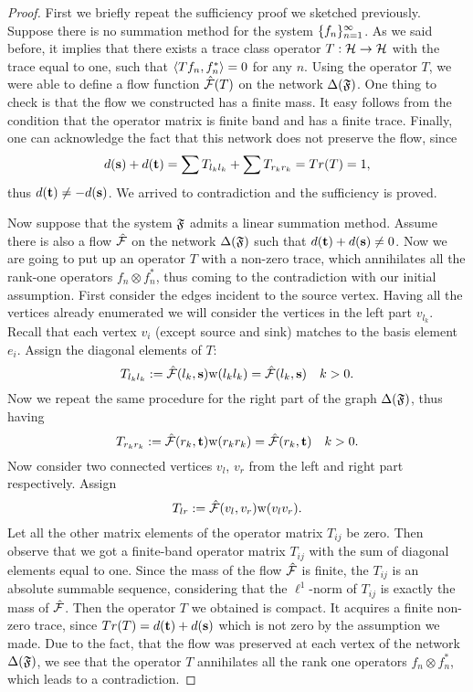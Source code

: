 \documentclass[12pt]{article}
\begin{document}
    \begin{proof}
      First we briefly repeat the sufficiency proof we sketched previously.
      Suppose there is no summation method for the system $\seq{f}$.
      As we said before, it implies that there exists a trace class operator $T : \cal{H} \to \cal{H}$ with
      the trace equal to one, such that $\inner{Tf_n}{f_n^*} = 0$ for any $n$.
      Using the operator $T$, we were able to define a flow function $\flow(T)$ on the network
      $\net(\fsys)$.
      One thing to check is that the flow we constructed has a finite mass.
      It easy follows from the condition that the operator matrix is finite band and has a finite trace.
      Finally, one can acknowledge the fact that this network does not preserve the flow, since
      \[
        d(\source) + d(\sink) = \sum T_{l_k l_k} + \sum T_{r_k r_k} = Tr(T) = 1,
      \]
      thus $d(\sink) \neq -d(\source)$.
      We arrived to contradiction and the sufficiency is proved.

      Now suppose that the system $\fsys$ admits a linear summation method.
      Assume there is also a flow $\flow$ on the network $\net(\fsys)$ such that $d(\sink) + d(\source) \neq 0$.
      Now we are going to put up an operator $T$ with a non-zero trace, which annihilates all the rank-one
      operators $f_n \otimes f^*_n$, thus coming to the contradiction with our initial assumption.
      First consider the edges incident to the source vertex.
      Having all the vertices already enumerated we will consider the vertices in the left part $v_{l_k}$.
      Recall that each vertex $v_i$ (except source and sink) matches to the basis element $e_i$.
      Assign the diagonal elements of $T$:
      \[
        T_{l_k l_k} := \flow(l_k, \source) \wtp(l_k l_k) = \flow(l_k, \source) \quad k > 0.
      \]
      Now we repeat the same procedure for the right part of the graph $\net(\fsys)$, thus having
      \[
        T_{r_k r_k} := \flow(r_k, \sink) \wtp(r_k r_k) = \flow(r_k, \sink) \quad k > 0.
      \]
      Now consider two connected vertices $v_l$, $v_r$ from the left and right part
        respectively. Assign
      \[
        T_{lr} := \flow(v_l, v_r) \wtp(v_l  v_r).
      \]
      Let all the other matrix elements of the operator matrix $T_{ij}$ be zero.
      Then observe that we got a finite-band operator matrix $T_{ij}$ with the sum of diagonal elements
      equal to one.
      Since the mass of the flow $\flow$ is finite, the $T_{ij}$ is an absolute summable sequence, considering that
        the $\ell^1$-norm of $T_{ij}$ is exactly the mass of $\flow$.
      Then the operator $T$ we obtained is compact.
      It acquires a finite non-zero trace, since $Tr(T) = d(\sink) + d(\source)$ which is not zero
        by the assumption we made.
      Due to the fact, that the flow was preserved at each vertex of the network $\net(\fsys)$,
        we see that the operator $T$ annihilates all the rank one operators $f_n \otimes f^*_n$,
        which leads to a contradiction.
    \end{proof}
\end{document}
